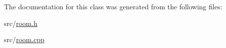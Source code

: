 The documentation for this class was generated from the following files\-:\begin{DoxyCompactItemize}
\item 
src/\hyperlink{room_8h}{room.\-h}\item 
src/\hyperlink{room_8cpp}{room.\-cpp}\end{DoxyCompactItemize}
